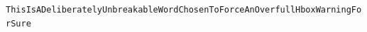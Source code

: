\documentclass{article}
\begin{document}
\noindent\texttt{ThisIsADeliberatelyUnbreakableWordChosenToForceAnOverfullHboxWarningForSure}
\end{document}
